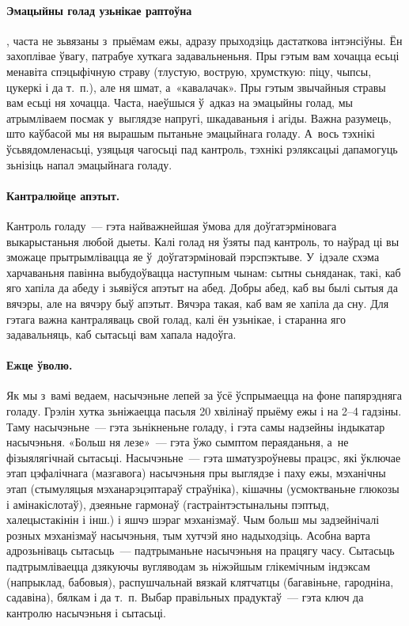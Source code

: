 \paragraph{Эмацыйны голад узьнікае раптоўна}, часта не зьвязаны з~прыёмам ежы, адразу прыходзіць дастаткова інтэнсіўны.
Ён захоплівае ўвагу, патрабуе хуткага задавальненьня. Пры гэтым вам хочацца есьці менавіта спэцыфічную страву (тлустую, вострую, хрумсткую: піцу, чыпсы, цукеркі і да т.~п.), але ня шмат, а~«кавалачак». Пры гэтым звычайныя стравы вам есьці ня хочацца. Часта, наеўшыся ў~адказ на эмацыйны голад, мы атрымліваем посмак у~выглядзе напругі, шкадаваньня і агіды. Важна разумець, што каўбасой мы ня вырашым пытаньне эмацыйнага голаду. А~вось тэхнікі ўсьвядомленасьці, узяцьця чагосьці пад кантроль, тэхнікі рэляксацыі дапамогуць зьнізіць напал эмацыйнага голаду.

\paragraph{Кантралюйце апэтыт.}
Кантроль голаду~--- гэта найважнейшая ўмова для доўгатэрміновага выкарыстаньня любой дыеты. Калі голад ня ўзяты пад кантроль, то наўрад ці вы зможаце прытрымлівацца яе ў~доўгатэрміновай пэрспэктыве. У~ідэале схэма харчаваньня павінна выбудоўвацца наступным чынам: сытны сьняданак, такі, каб яго хапіла да абеду і зьявіўся апэтыт на абед. Добры абед, каб вы былі сытыя да вячэры, але на вячэру быў апэтыт. Вячэра такая, каб вам яе хапіла да сну. Для гэтага важна кантраляваць свой голад, калі ён узьнікае, і старанна яго задавальняць, каб сытасьці вам хапала надоўга.

\paragraph{Ежце ўволю.}
Як мы з~вамі ведаем, насычэньне лепей за ўсё ўспрымаецца на фоне папярэдняга голаду. Грэлін хутка зьніжаецца пасьля 20 хвілінаў прыёму ежы і на 2--4 гадзіны. Таму насычэньне~--- гэта зьнікненьне голаду, і гэта самы надзейны індыкатар насычэньня. «Больш ня лезе»~--- гэта ўжо сымптом пераяданьня, а~не фізыялягічнай сытасьці. Насычэньне~--- гэта шматузроўневы працэс, які ўключае этап цэфалічнага (мазгавога) насычэньня пры выглядзе і паху ежы, мэханічны этап (стымуляцыя мэханарэцэптараў страўніка), кішачны (усмоктваньне глюкозы і амінакіслотаў), дзеяньне гармонаў (гастраінтэстынальны пэптыд, халецыстакінін і інш.) і яшчэ шэраг мэханізмаў. Чым больш мы задзейнічалі розных мэханізмаў насычэньня, тым хутчэй яно надыходзіць. Асобна варта адрозьніваць сытасьць~--- падтрыманьне насычэньня на працягу часу. Сытасьць падтрымліваецца дзякуючы вугляводам зь ніжэйшым глікемічным індэксам (напрыклад, бабовыя), распушчальнай вязкай клятчатцы (багавіньне, гародніна, садавіна), бялкам і да т.~п. Выбар правільных прадуктаў~--- гэта ключ да кантролю насычэньня і сытасьці.

